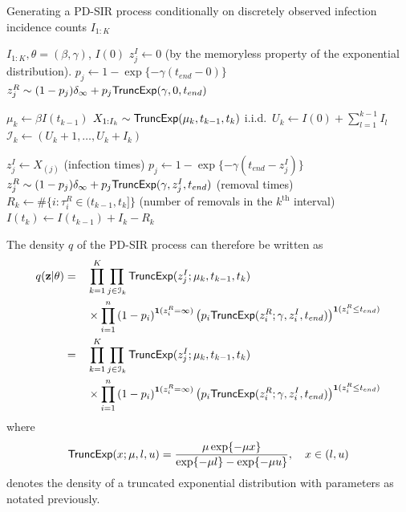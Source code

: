 \documentclass[11pt]{article}
\begin{document}
	\begin{algorithm}
		\caption{Generating a PD-SIR process conditionally on discretely observed infection incidence counts $I_{1:K}$}
		\label{alg:PD-SIR}
		\begin{algorithmic}
			\REQUIRE $I_{1:K}, \theta = (\beta, \gamma)$, $I(0)$
			\STATE $z^I_j \leftarrow 0$ (by the memoryless property of the exponential distribution).
			\STATE $p_j \leftarrow 1 - \exp\{-\gamma (t_{end} - 0)\}$
			\STATE $z^R_j \sim (1 - p_j) \delta_\infty + p_j \textsf{TruncExp}(\gamma, 0, t_{end})$
			\ENDFOR
			
			\STATE $\mu_k \leftarrow \beta I(t_{k-1})$
			\STATE $X_{1 : I_k} \sim \textsf{TruncExp}(\mu_k, t_{k-1}, t_k)$ i.i.d.\
			\STATE $U_k \leftarrow I(0) + \sum_{l=1}^{k-1} I_l$
			\STATE $\mathcal{I}_k \leftarrow (U_k + 1, \dots, U_k + I_k)$
			
			\STATE $z^I_j \leftarrow X_{(j)}$ (infection times)
			\STATE $p_j \leftarrow 1 - \exp\{-\gamma(t_{end} - z^I_j)\}$
			\STATE $z^R_j \sim (1 - p_j) \delta_\infty + p_j \textsf{TruncExp}(\gamma, z^I_j, t_{end})$ (removal times)
			\ENDFOR
			\STATE $R_k \leftarrow \#\{i:\tau^R_i \in (t_{k-1}, t_k]\}$ (number of removals in the $k^{\text{th}}$ interval)
			\STATE $I(t_k) \leftarrow I(t_{k-1}) + I_k - R_k$
			\ENDFOR
		\end{algorithmic}
	\end{algorithm}
	
	The density $q$ of the PD-SIR process can therefore be written as
	\begin{alignat*}{3}
		q(\mathbf{z}|\theta) & = && \prod_{k=1}^K \prod_{j\in\mathcal{I}_k} \textsf{TruncExp}(z^I_j; \mu_{k}, t_{k-1}, t_{k}) \\
		& && \times \prod_{i=1}^{n} \left( 1 - p_i \right)^{\mathbf{1}(z^R_i = \infty)} \left( p_i \textsf{TruncExp}(z^R_i; \gamma, z^I_i, t_{end}) \right)^{\mathbf{1}(z^R_i \le t_{end})} \\
		& = && \prod_{k=1}^K \prod_{j\in\mathcal{I}_k} \textsf{TruncExp}(z^I_j; \mu_{k}, t_{k-1}, t_{k}) \\
		& && \times \prod_{i=1}^{n} \left( 1 - p_i \right)^{\mathbf{1}(z^R_i = \infty)} \left( p_i \textsf{TruncExp}(z^R_i; \gamma, z^I_i, t_{end}) \right)^{\mathbf{1}(z^R_i \le t_{end})}
	\end{alignat*}
	where %
	$$\textsf{TruncExp}(x; \mu, l, u) = \dfrac{\mu \exp\{-\mu x\}}{\exp\{-\mu l\} - \exp\{-\mu u\}}, \quad x \in (l, u)$$
	denotes the density of a truncated exponential distribution with parameters as notated previously.
	
\end{document}
